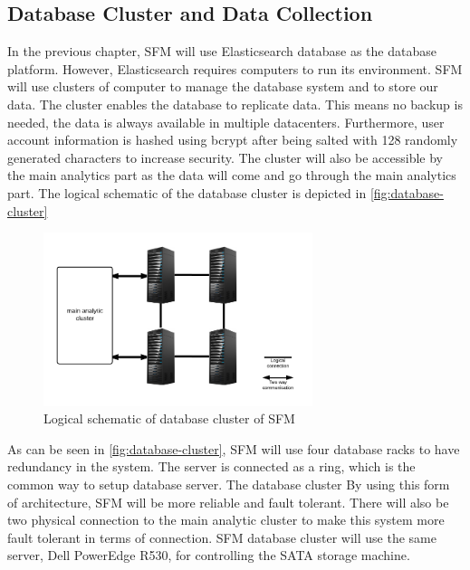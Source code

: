 \subsection{Database Cluster and Data Collection}
\label{subsec:database-data}
In the previous chapter, SFM will use Elasticsearch database as the database platform. However, Elasticsearch requires computers to run its environment. SFM will use clusters of computer to manage the database system and to store our data. The cluster enables the database to replicate data. This means no backup is needed, the data is always available in multiple datacenters. Furthermore, user account information is hashed using bcrypt after being salted with 128 randomly generated characters to increase security. The cluster will also be accessible by the main analytics part as the data will come and go through the main analytics part. The logical schematic of the database cluster is depicted in \autoref{fig:database-cluster}

\begin{figure}[H]
\centering
\includegraphics[width=0.7\textwidth]{6-hardware/images/db-cluster.png}
\caption{Logical schematic of database cluster of SFM}
\label{fig:database-cluster}
\end{figure}

As can be seen in \autoref{fig:database-cluster}, SFM will use four database racks to have redundancy in the system. The server is connected as a ring, which is the common way to setup database server. The database cluster By using this form of architecture, SFM will be more reliable and fault tolerant. There will also be two physical connection to the main analytic cluster to make this system more fault tolerant in terms of connection. SFM database cluster will use the same server, Dell PowerEdge R530, for controlling the SATA storage machine.


